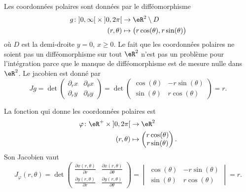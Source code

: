 Les coordonnées polaires sont données par le difféomorphisme
\begin{equation}
	\begin{aligned}
		g\colon \mathopen]0,\infty\mathclose[\times\mathopen]0,2\pi\mathclose[ & \to\eR^2\setminus D                             \\
		(r,\theta)                                                             & \mapsto \big( r\cos(\theta),r\sin(\theta) \big)
	\end{aligned}
\end{equation}
où \( D\) est la demi-droite \( y=0\), \( x\geq 0\). Le fait que les coordonnées polaires ne soient pas un difféomorphisme sur tout \( \eR^2\) n'est pas un problème pour l'intégration parce que le manque de difféomorphisme est de mesure nulle dans \( \eR^2\). Le jacobien est donné par
\begin{equation}
	Jg=\det\begin{pmatrix}
		\partial_rx & \partial_{\theta}x \\
		\partial_ry & \partial_{\theta}y
	\end{pmatrix}=\det\begin{pmatrix}
		\cos(\theta) & -r\sin(\theta) \\
		\sin(\theta) & r\cos(\theta)
	\end{pmatrix}=r.
\end{equation}

La fonction qui donne les coordonnées polaires est
\begin{equation}
	\begin{aligned}
		\varphi\colon \eR^+\times\mathopen] 0 , 2\pi \mathclose[ & \to \eR^2             \\
		(r,\theta)                                               & \mapsto\begin{pmatrix}
			                                                                  r\cos(\theta) \\
			                                                                  r\sin(\theta)
		                                                                  \end{pmatrix}.
	\end{aligned}
\end{equation}
Son Jacobien vaut
\begin{equation}
	J_{\varphi}(r,\theta)=\det\begin{pmatrix}
		\frac{ \partial x(r,\theta) }{ \partial r } & \frac{ \partial x(r,\theta) }{ \partial \theta } \\
		\frac{ \partial y(r,\theta) }{ \partial r } & \frac{ \partial y(r,\theta) }{ \partial \theta }
	\end{pmatrix}=
	\begin{vmatrix}
		\cos(\theta) & -r\sin(\theta) \\
		\sin(\theta) & r\cos(\theta)
	\end{vmatrix}=r.
\end{equation}

